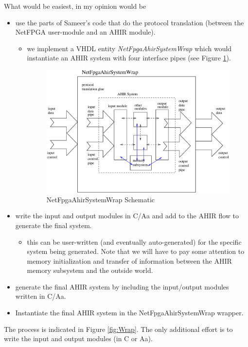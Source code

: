 \documentclass{article}
\begin{document}
What would be easiest, in my opinion would be
\begin{itemize}
\item use the parts of Sameer's code that do the protocol
translation (between the NetFPGA user-module and an AHIR module).
\begin{itemize}
\item we implement a VHDL entity {\em NetFpgaAhirSystemWrap} which 
would instantiate an AHIR system with four interface pipes (see Figure \ref{fig:NetFpgaAhirSystemWrap}).
\begin{figure}
  \centering
  \includegraphics[scale=0.7]{NetFpgaAhirSystemWrap.eps}
  \caption{NetFpgaAhirSystemWrap Schematic}
  \label{fig:NetFpgaAhirSystemWrap}
\end{figure}
\end{itemize}
\item write the input and output modules in C/Aa and add
to the AHIR flow to generate the final system. 
\begin{itemize}
\item this can be user-written (and eventually auto-generated) for
the specific system being generated.  Note that we will have
to pay some attention to memory initialization and transfer of
information between the AHIR memory subsystem and the outside
world.
\end{itemize}
\item generate the final AHIR system by including the input/output modules
written in C/Aa.
\item Instantiate the final AHIR system in the NetFpgaAhirSystemWrap wrapper.
\end{itemize}
The process is indicated in Figure \ref{fig:Wrap}.   The only
additional effort is to write the input and output modules (in C or Aa).
\end{document}
